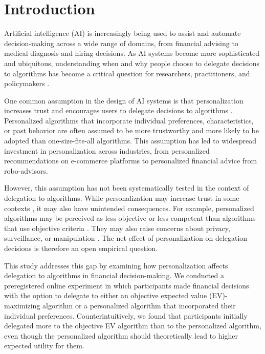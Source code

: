 \section{Introduction}

Artificial intelligence (AI) is increasingly being used to assist and automate decision-making across a wide range of domains, from financial advising to medical diagnosis and hiring decisions. As AI systems become more sophisticated and ubiquitous, understanding when and why people choose to delegate decisions to algorithms has become a critical question for researchers, practitioners, and policymakers \citep{lee2004, kohn2021}.

One common assumption in the design of AI systems is that personalization increases trust and encourages users to delegate decisions to algorithms \citep{longoni2019, jussupow2020}. Personalized algorithms that incorporate individual preferences, characteristics, or past behavior are often assumed to be more trustworthy and more likely to be adopted than one-size-fits-all algorithms. This assumption has led to widespread investment in personalization across industries, from personalized recommendations on e-commerce platforms to personalized financial advice from robo-advisors.

However, this assumption has not been systematically tested in the context of delegation to algorithms. While personalization may increase trust in some contexts \citep{longoni2019}, it may also have unintended consequences. For example, personalized algorithms may be perceived as less objective or less competent than algorithms that use objective criteria \citep{castelo2019}. They may also raise concerns about privacy, surveillance, or manipulation \citep{hoff2015}. The net effect of personalization on delegation decisions is therefore an open empirical question.

This study addresses this gap by examining how personalization affects delegation to algorithms in financial decision-making. We conducted a preregistered online experiment in which participants made financial decisions with the option to delegate to either an objective expected value (EV)-maximizing algorithm or a personalized algorithm that incorporated their individual preferences. Counterintuitively, we found that participants initially delegated more to the objective EV algorithm than to the personalized algorithm, even though the personalized algorithm should theoretically lead to higher expected utility for them.

